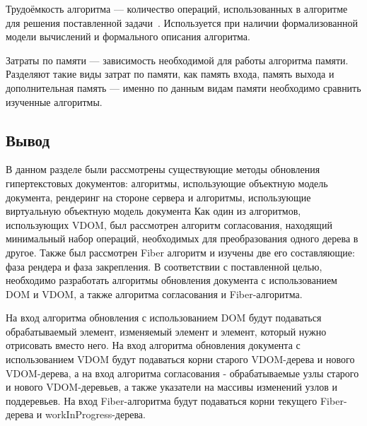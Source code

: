 Трудоёмкость алгоритма --- количество операций, использованных в алгоритме для решения поставленной задачи~\cite{model}. Используется при наличии формализованной модели вычислений и формального описания алгоритма.

Затраты по памяти --- зависимость необходимой для работы алгоритма памяти. Разделяют такие виды затрат по памяти, как память входа, память выхода и дополнительная память --- именно по данным видам памяти необходимо сравнить изученные алгоритмы.

\subsection*{Вывод}

В данном разделе были рассмотрены существующие методы обновления гипертекстовых документов: алгоритмы, использующие объектную модель документа, рендеринг на стороне сервера и алгоритмы, использующие виртуальную объектную модель документа
Как один из алгоритмов, использующих VDOM, был рассмотрен алгоритм согласования, находящий минимальный набор операций, необходимых для преобразования одного дерева в другое.
Также был рассмотрен Fiber алгоритм и изучены две его составляющие: фаза рендера и фаза закрепления.
В соответствии с поставленной целью, необходимо разработать алгоритмы обновления документа с использованием DOM и VDOM, а также алгоритма согласования и Fiber-алгоритма.

На вход алгоритма обновления с использованием DOM будут подаваться обрабатываемый элемент, изменяемый элемент и элемент, который нужно отрисовать вместо него.
На вход алгоритма обновления документа с использованием VDOM будут подаваться корни старого VDOM-дерева и нового VDOM-дерева, а на вход алгоритма согласования - обрабатываемые узлы старого и нового VDOM-деревьев, а также указатели на массивы изменений узлов и поддеревьев.
На вход Fiber-алгоритма будут подаваться корни текущего Fiber-дерева и workInProgress-дерева.